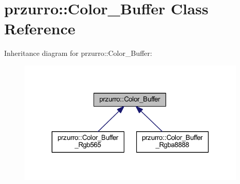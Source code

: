 \hypertarget{classprzurro_1_1_color___buffer}{}\section{przurro\+::Color\+\_\+\+Buffer Class Reference}
\label{classprzurro_1_1_color___buffer}


Inheritance diagram for przurro\+::Color\+\_\+\+Buffer\+:
\nopagebreak
\begin{figure}[H]
\begin{center}
\leavevmode
\includegraphics[width=308pt]{d0/d50/classprzurro_1_1_color___buffer__inherit__graph}
\end{center}
\end{figure}
